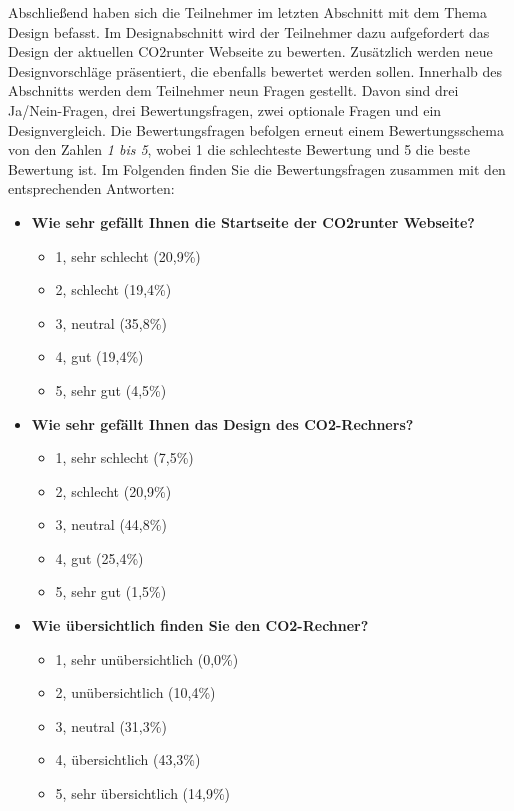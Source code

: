 Abschließend haben sich die Teilnehmer im letzten Abschnitt mit dem Thema Design befasst.
Im Designabschnitt wird der Teilnehmer dazu aufgefordert das Design der aktuellen CO2runter Webseite zu bewerten.
Zusätzlich werden neue Designvorschläge präsentiert, die ebenfalls bewertet werden sollen.
Innerhalb des Abschnitts werden dem Teilnehmer neun Fragen gestellt.
Davon sind drei Ja/Nein-Fragen, drei Bewertungsfragen, zwei optionale Fragen und ein Designvergleich.
Die Bewertungsfragen befolgen erneut einem Bewertungsschema von den Zahlen \textit{1 bis 5}, wobei 1 die schlechteste Bewertung und 5 die beste Bewertung ist.
Im Folgenden finden Sie die Bewertungsfragen zusammen mit den entsprechenden Antworten:
\begin{itemize}
    \item \textbf{Wie sehr gefällt Ihnen die Startseite der CO2runter Webseite?}
    \begin{itemize}
        \item 1, sehr schlecht (20,9\%)
        \item 2, schlecht (19,4\%)
        \item 3, neutral (35,8\%)
        \item 4, gut (19,4\%)
        \item 5, sehr gut (4,5\%)
    \end{itemize}
    \item \textbf{Wie sehr gefällt Ihnen das Design des CO2-Rechners?}
    \begin{itemize}
        \item 1, sehr schlecht (7,5\%)
        \item 2, schlecht (20,9\%)
        \item 3, neutral (44,8\%)
        \item 4, gut (25,4\%)
        \item 5, sehr gut (1,5\%)
    \end{itemize}
    \item \textbf{Wie übersichtlich finden Sie den CO2-Rechner?}
    \begin{itemize}
        \item 1, sehr unübersichtlich (0,0\%)
        \item 2, unübersichtlich (10,4\%)
        \item 3, neutral (31,3\%)
        \item 4, übersichtlich (43,3\%)
        \item 5, sehr übersichtlich (14,9\%)
    \end{itemize}
\end{itemize}
